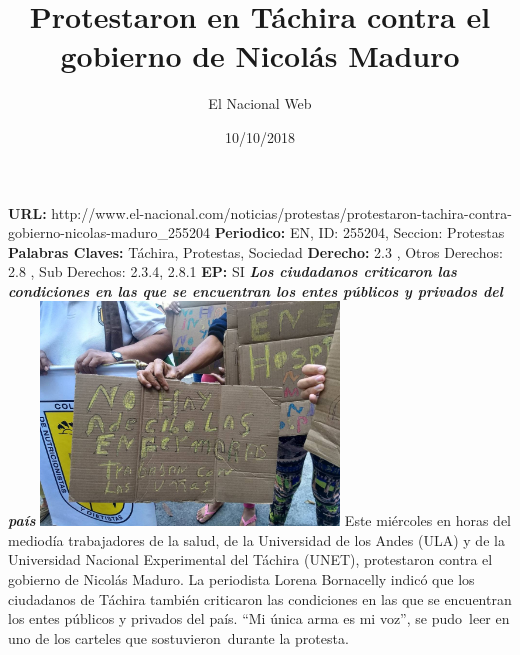 \documentclass{article}%
\title{\textbf{Protestaron en Táchira contra el gobierno de Nicolás Maduro}}%
\author{El Nacional Web}%
\date{10/10/2018}%
\begin{document}
%
\normalsize%
\maketitle%
\textbf{URL: }%
http://www.el{-}nacional.com/noticias/protestas/protestaron{-}tachira{-}contra{-}gobierno{-}nicolas{-}maduro\_255204\newline%
%
\textbf{Periodico: }%
EN, %
ID: %
255204, %
Seccion: %
Protestas\newline%
%
\textbf{Palabras Claves: }%
Táchira, Protestas, Sociedad\newline%
%
\textbf{Derecho: }%
2.3%
, Otros Derechos: %
2.8%
, Sub Derechos: %
2.3.4, 2.8.1%
\newline%
%
\textbf{EP: }%
SI\newline%
\newline%
%
\textbf{\textit{Los ciudadanos criticaron las condiciones en las que se encuentran los entes públicos y privados del país}}%
\newline%
\newline%
%
\includegraphics[width=300px]{167.jpg}%
\newline%
%
Este miércoles en horas del mediodía trabajadores de la salud, de la Universidad de los Andes (ULA) y de la Universidad Nacional Experimental del Táchira (UNET), protestaron contra el gobierno de Nicolás Maduro.%
\newline%
%
La periodista Lorena Bornacelly indicó que los ciudadanos de Táchira también criticaron las condiciones en las que se encuentran los entes públicos y privados del país.%
\newline%
%
“Mi única arma es mi voz”, se pudo~leer en uno de los carteles que sostuvieron~durante la protesta.%
\newline%
%
\end{document}
